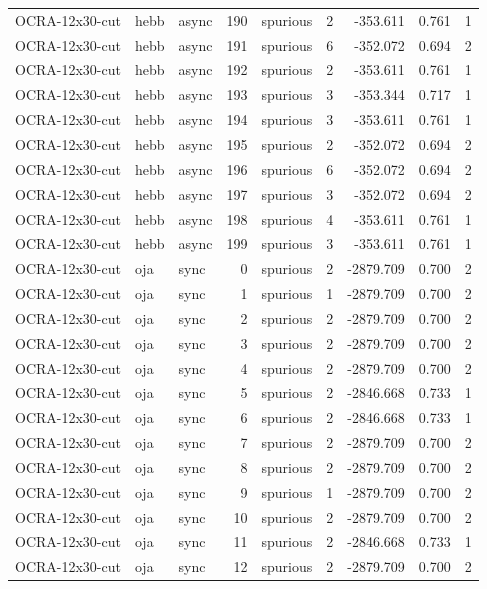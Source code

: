 \begin{tabular}{lllrlrrrr}
OCRA-12x30-cut & hebb & async & 190 & spurious & 2 & -353.611 & 0.761 & 1 \\
OCRA-12x30-cut & hebb & async & 191 & spurious & 6 & -352.072 & 0.694 & 2 \\
OCRA-12x30-cut & hebb & async & 192 & spurious & 2 & -353.611 & 0.761 & 1 \\
OCRA-12x30-cut & hebb & async & 193 & spurious & 3 & -353.344 & 0.717 & 1 \\
OCRA-12x30-cut & hebb & async & 194 & spurious & 3 & -353.611 & 0.761 & 1 \\
OCRA-12x30-cut & hebb & async & 195 & spurious & 2 & -352.072 & 0.694 & 2 \\
OCRA-12x30-cut & hebb & async & 196 & spurious & 6 & -352.072 & 0.694 & 2 \\
OCRA-12x30-cut & hebb & async & 197 & spurious & 3 & -352.072 & 0.694 & 2 \\
OCRA-12x30-cut & hebb & async & 198 & spurious & 4 & -353.611 & 0.761 & 1 \\
OCRA-12x30-cut & hebb & async & 199 & spurious & 3 & -353.611 & 0.761 & 1 \\
OCRA-12x30-cut & oja & sync & 0 & spurious & 2 & -2879.709 & 0.700 & 2 \\
OCRA-12x30-cut & oja & sync & 1 & spurious & 1 & -2879.709 & 0.700 & 2 \\
OCRA-12x30-cut & oja & sync & 2 & spurious & 2 & -2879.709 & 0.700 & 2 \\
OCRA-12x30-cut & oja & sync & 3 & spurious & 2 & -2879.709 & 0.700 & 2 \\
OCRA-12x30-cut & oja & sync & 4 & spurious & 2 & -2879.709 & 0.700 & 2 \\
OCRA-12x30-cut & oja & sync & 5 & spurious & 2 & -2846.668 & 0.733 & 1 \\
OCRA-12x30-cut & oja & sync & 6 & spurious & 2 & -2846.668 & 0.733 & 1 \\
OCRA-12x30-cut & oja & sync & 7 & spurious & 2 & -2879.709 & 0.700 & 2 \\
OCRA-12x30-cut & oja & sync & 8 & spurious & 2 & -2879.709 & 0.700 & 2 \\
OCRA-12x30-cut & oja & sync & 9 & spurious & 1 & -2879.709 & 0.700 & 2 \\
OCRA-12x30-cut & oja & sync & 10 & spurious & 2 & -2879.709 & 0.700 & 2 \\
OCRA-12x30-cut & oja & sync & 11 & spurious & 2 & -2846.668 & 0.733 & 1 \\
OCRA-12x30-cut & oja & sync & 12 & spurious & 2 & -2879.709 & 0.700 & 2 \\

\end{tabular}
